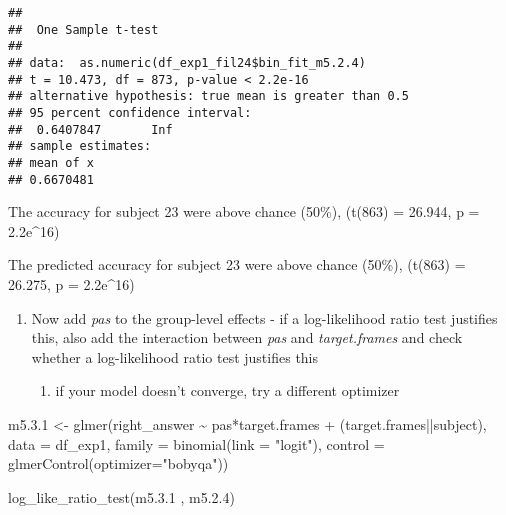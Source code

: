 \documentclass[
]{article}
\newenvironment{Shaded}{\begin{snugshade}}{\end{snugshade}}
\newcommand{\AttributeTok}[1]{\textcolor[rgb]{0.77,0.63,0.00}{#1}}
\newcommand{\CommentTok}[1]{\textcolor[rgb]{0.56,0.35,0.01}{\textit{#1}}}
\newcommand{\FloatTok}[1]{\textcolor[rgb]{0.00,0.00,0.81}{#1}}
\newcommand{\FunctionTok}[1]{\textcolor[rgb]{0.00,0.00,0.00}{#1}}
\newcommand{\NormalTok}[1]{#1}
\newcommand{\OtherTok}[1]{\textcolor[rgb]{0.56,0.35,0.01}{#1}}
\newcommand{\SpecialCharTok}[1]{\textcolor[rgb]{0.00,0.00,0.00}{#1}}
\newcommand{\StringTok}[1]{\textcolor[rgb]{0.31,0.60,0.02}{#1}}
\providecommand{\tightlist}{%
  \setlength{\itemsep}{0pt}\setlength{\parskip}{0pt}}
\begin{document}
\begin{Shaded}
\end{Shaded}

\begin{verbatim}
## 
##  One Sample t-test
## 
## data:  as.numeric(df_exp1_fil24$bin_fit_m5.2.4)
## t = 10.473, df = 873, p-value < 2.2e-16
## alternative hypothesis: true mean is greater than 0.5
## 95 percent confidence interval:
##  0.6407847       Inf
## sample estimates:
## mean of x 
## 0.6670481
\end{verbatim}

The accuracy for subject 23 were above chance (50\%), (t(863) = 26.944,
p = 2.2e\^{}16)

The predicted accuracy for subject 23 were above chance (50\%), (t(863)
= 26.275, p = 2.2e\^{}16)

\begin{enumerate}
\def\labelenumi{\arabic{enumi})}
\setcounter{enumi}{2}
\item
  Now add \emph{pas} to the group-level effects - if a log-likelihood
  ratio test justifies this, also add the interaction between \emph{pas}
  and \emph{target.frames} and check whether a log-likelihood ratio test
  justifies this

  \begin{enumerate}
  \def\labelenumii{\roman{enumii}.}
  \tightlist
  \item
    if your model doesn't converge, try a different optimizer
  \end{enumerate}
\end{enumerate}

\begin{Shaded}
\begin{Highlighting}[]
\NormalTok{m5.}\FloatTok{3.1} \OtherTok{\textless{}{-}} \FunctionTok{glmer}\NormalTok{(right\_answer }\SpecialCharTok{\textasciitilde{}}\NormalTok{ pas}\SpecialCharTok{*}\NormalTok{target.frames }\SpecialCharTok{+}\NormalTok{ (target.frames}\SpecialCharTok{||}\NormalTok{subject), }\AttributeTok{data =}\NormalTok{ df\_exp1, }\AttributeTok{family =} \FunctionTok{binomial}\NormalTok{(}\AttributeTok{link =} \StringTok{"logit"}\NormalTok{), }\AttributeTok{control =} \FunctionTok{glmerControl}\NormalTok{(}\AttributeTok{optimizer=}\StringTok{"bobyqa"}\NormalTok{))}



\FunctionTok{log\_like\_ratio\_test}\NormalTok{(m5.}\FloatTok{3.1}\NormalTok{ , m5.}\FloatTok{2.4}\NormalTok{)}
\end{Highlighting}
\end{Shaded}
\end{document}
